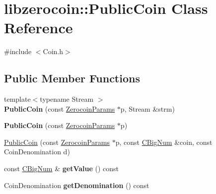\hypertarget{classlibzerocoin_1_1_public_coin}{}\section{libzerocoin\+::Public\+Coin Class Reference}
\label{classlibzerocoin_1_1_public_coin}


{\ttfamily \#include $<$Coin.\+h$>$}

\subsection*{Public Member Functions}
\begin{DoxyCompactItemize}
\item 
\mbox{\label{classlibzerocoin_1_1_public_coin_ad4544eb813805545f3cb16e75a110415}} 
{\footnotesize template$<$typename Stream $>$ }\\{\bfseries Public\+Coin} (const \mbox{\hyperlink{classlibzerocoin_1_1_zerocoin_params}{Zerocoin\+Params}} $\ast$p, Stream \&strm)
\item 
\mbox{\label{classlibzerocoin_1_1_public_coin_a3d4568ae75e82a14be9d2b1e9e11b17f}} 
{\bfseries Public\+Coin} (const \mbox{\hyperlink{classlibzerocoin_1_1_zerocoin_params}{Zerocoin\+Params}} $\ast$p)
\item 
\mbox{\hyperlink{classlibzerocoin_1_1_public_coin_a514aa6588149238148c7cbae15181b1c}{Public\+Coin}} (const \mbox{\hyperlink{classlibzerocoin_1_1_zerocoin_params}{Zerocoin\+Params}} $\ast$p, const \mbox{\hyperlink{class_c_big_num}{C\+Big\+Num}} \&coin, const Coin\+Denomination d)
\item 
\mbox{\label{classlibzerocoin_1_1_public_coin_abf335a1f7458e510bf46a73611200b3b}} 
const \mbox{\hyperlink{class_c_big_num}{C\+Big\+Num}} \& {\bfseries get\+Value} () const
\item 
\mbox{\label{classlibzerocoin_1_1_public_coin_a150f84ac8998d73e223c74a311d48891}} 
Coin\+Denomination {\bfseries get\+Denomination} () const
\item 
\mbox{\label{classlibzerocoin_1_1_public_coin_a29c59b2fd71163c417eb35633fdf0e8c}} 

\end{DoxyCompactItemize}
